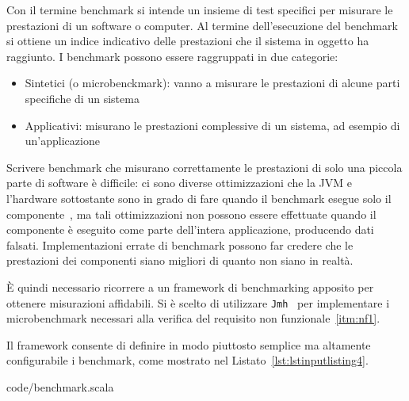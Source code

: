 Con il termine benchmark si intende un insieme di test specifici per misurare le prestazioni di un software o computer.
Al termine dell'esecuzione del benchmark si ottiene un indice indicativo delle prestazioni che il sistema in oggetto ha
raggiunto.
I benchmark possono essere raggruppati in due categorie:
\begin{itemize}
    \item Sintetici (o microbenckmark): vanno a misurare le prestazioni di alcune parti specifiche di un sistema
    \item Applicativi: misurano le prestazioni complessive di un sistema, ad esempio di un'applicazione
\end{itemize}

Scrivere benchmark che misurano correttamente le prestazioni di solo una piccola parte di software è difficile: ci sono
diverse ottimizzazioni che la JVM e l'hardware sottostante sono in grado di fare quando il benchmark
esegue solo il componente~\cite{jmh:details}, ma tali ottimizzazioni non possono essere effettuate quando il componente
è eseguito come parte dell'intera applicazione, producendo dati falsati.
Implementazioni errate di benchmark possono far credere che le prestazioni dei componenti siano migliori di quanto non
siano in realtà.

È quindi necessario ricorrere a un framework di benchmarking apposito per ottenere misurazioni affidabili.
Si è scelto di utilizzare \texttt{Jmh}~\cite{jmh} per implementare i microbenchmark necessari alla verifica del
requisito non funzionale~\ref{itm:nf1}.

Il framework consente di definire in modo piuttosto semplice ma altamente configurabile i benchmark, come mostrato nel
Listato~\ref{lst:lstinputlisting4}.


{code/benchmark.scala}

